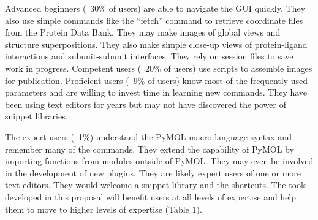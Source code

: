 Advanced beginners (~30\% of users) are able to navigate the GUI quickly. 
They also use simple commands like the ``fetch'' command to retrieve coordinate files from the Protein Data Bank. 
They may make images of global views and structure superpositions. 
They also make simple close-up views of protein-ligand interactions and subunit-subunit interfaces. 
They rely on session files to save work in progress. 
Competent users (~20\% of users) use scripts to assemble images for publication.
Proficient users (~9\% of users) know most of the frequently used parameters and are willing to invest time in learning new commands. 
They have been using text editors for years but may not have discovered the power of snippet libraries. 

The expert users (~1\%) understand the PyMOL macro language syntax and remember many of the commands. 
They extend the capability of PyMOL by importing functions from modules outside of PyMOL.
They may even be involved in the development of new plugins. 
They are likely expert users of one or more text editors. 
They would welcome a snippet library and the shortcuts. 
The tools developed in this proposal will benefit users at all levels of expertise and help them to move to higher levels of expertise (Table 1).



